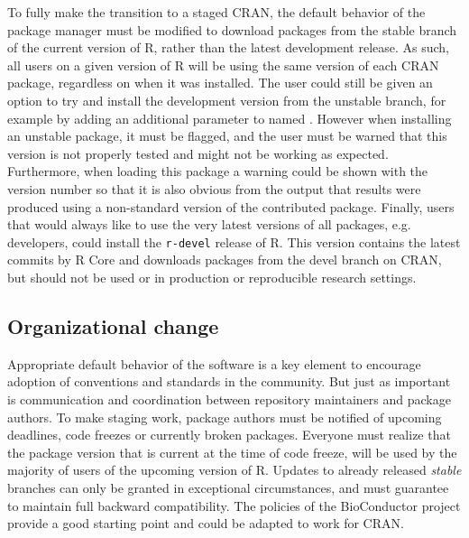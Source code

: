 To fully make the transition to a staged CRAN, the default behavior of the
package manager must be modified to download packages from the stable branch of
the current version of R, rather than the latest development release. As such,
all users on a given version of R will be using the same version of each CRAN
package, regardless on when it was installed. The user could still be given an
option to try and install the development version from the unstable branch, for
example by adding an additional parameter to  named
. However when installing an unstable package, it must be
flagged, and the user must be warned that this version is not properly tested
and might not be working as expected. Furthermore, when loading this package a
warning could be shown with the version number so that it is also obvious from
the output that results were produced using a non-standard version of the
contributed package. Finally, users that would always like to use the very
latest versions of all packages, e.g. developers, could install the
\texttt{r-devel} release of R. This version contains the latest commits by R
Core and downloads packages from the devel branch on CRAN, but should not be
used or in production or reproducible research settings.

\subsection{Organizational change}

Appropriate default behavior of the software is a key element to encourage
adoption of conventions and standards in the community. But just as important is
communication and coordination between repository maintainers and package authors.
To make staging work, package authors must be notified of upcoming deadlines,
code freezes or currently broken packages. Everyone must realize that the
package version that is current at the time of code freeze, will be used by the
majority of users of the upcoming version of R. Updates to already released
\emph{stable} branches can only be granted in exceptional circumstances, and
must guarantee to maintain full backward compatibility. The policies of the
BioConductor project provide a good starting point and could be adapted to work
for CRAN.

